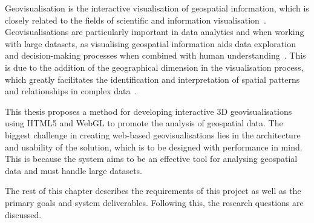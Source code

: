 
Geovisualisation is the interactive visualisation of geospatial information, which is closely related to the fields of scientific and information visualisation~\parencite{jiang2005geovisualization}. Geovisualisations are particularly important in data analytics and when working with large datasets, as visualising geospatial information aids data exploration and decision-making processes when combined with human understanding~\parencite{grinstein2002introduction, hendley1995case}. This is due to the addition of the geographical dimension in the visualisation process, which greatly facilitates the identification and interpretation of spatial patterns and relationships in complex data~\parencite{kwan2004geovisualization}.

This thesis proposes a method for developing interactive 3D geovisualisations using HTML5 and WebGL to promote the analysis of geospatial data. The biggest challenge in creating web-based geovisualisations lies in the architecture and usability of the solution, which is to be designed with performance in mind. This is because the system aims to be an effective tool for analysing geospatial data and must handle large datasets.

The rest of this chapter describes the requirements of this project as well as the primary goals and system deliverables. Following this, the research questions are discussed.

